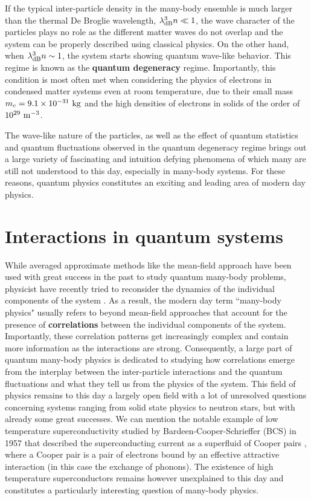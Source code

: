 \noindent If the typical inter-particle density in the many-body ensemble is much larger than the thermal De Broglie wavelength, \ie $\lambda_{\rm{dB}}^3 n \ll 1$, the wave character of the particles plays no role as the different matter waves do not overlap and the system can be properly described using classical physics. On the other hand, when $\lambda_{\rm{dB}}^3 n \sim 1$, the system starts showing quantum wave-like behavior. This regime is known as the \textbf{quantum degeneracy} regime. Importantly, this condition is most often met when considering the physics of electrons in condensed matter systems even at room temperature, due to their small mass $m_e = 9.1 \times 10^{-31} \ \rm{kg}$ and the high densities of electrons in solids of the order of $10^{29} \ \rm{m}^{-3}$.

The wave-like nature of the particles, as well as the effect of quantum statistics and quantum fluctuations observed in the quantum degeneracy regime brings out a large variety of fascinating and intuition defying phenomena of which many are still not understood to this day, especially in many-body systems. For these reasons, quantum physics constitutes an exciting and leading area of modern day physics.

\section*{Interactions in quantum systems}

While averaged approximate methods like the mean-field approach have been used with great success in the past to study quantum many-body problems, physicist have recently tried to reconsider the dynamics of the individual components of the system \cite{lavoine2021,papp2008bragg,schweigler2017experimental,wenz2013few}. As a result, the modern day term ``many-body physics" usually refers to beyond mean-field approaches that account for the presence of \textbf{correlations} between the individual components of the system. Importantly, these correlation patterns get increasingly complex and contain more information as the interactions are strong. Consequently, a large part of quantum many-body physics is dedicated to studying how correlations emerge from the interplay between the inter-particle interactions and the quantum fluctuations and what they tell us from the physics of the system. This field of physics remains to this day a largely open field with a lot of unresolved questions concerning systems ranging from solid state physics to neutron stars, but with already some great successes. We can mention the notable example of low temperature superconductivity studied by Bardeen-Cooper-Schrieffer \cite{bardeen1957theory} (BCS) in 1957 that described the superconducting current as a superfluid of Cooper pairs \cite{cooper1956bound}, where a Cooper pair is a pair of electrons bound by an effective attractive interaction (in this case the exchange of phonons). The existence of high temperature superconductors remains however unexplained to this day and constitutes a particularly interesting question of many-body physics.

